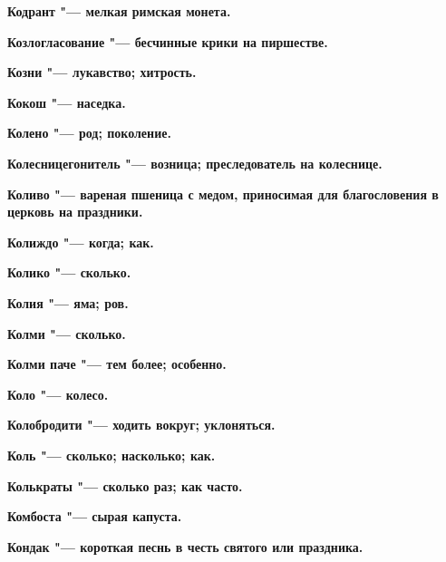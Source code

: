 \bfseries Кодрант \normalfont{} "--- мелкая римская монета. 




\bfseries Козлогласование \normalfont{} "--- бесчинные крики на пиршестве. 




\bfseries Козни \normalfont{} "--- лукавство; хитрость. 




\bfseries Кокош \normalfont{} "--- наседка. 




\bfseries Колено \normalfont{} "--- род; поколение. 




\bfseries Колесницегонитель \normalfont{} "--- возница; преследователь на колеснице. 




\bfseries Коливо \normalfont{} "--- вареная пшеница с медом, приносимая для благословения в церковь на праздники. 




\bfseries Колиждо \normalfont{} "--- когда; как. 




\bfseries Колико \normalfont{} "--- сколько. 




\bfseries Колия \normalfont{} "--- яма; ров. 




\bfseries Колми \normalfont{} "--- сколько. 




\bfseries Колми паче \normalfont{} "--- тем более; особенно. 




\bfseries Коло \normalfont{} "--- колесо. 




\bfseries Колобродити \normalfont{} "--- ходить вокруг; уклоняться. 




\bfseries Коль \normalfont{} "--- сколько; насколько; как. 




\bfseries Колькраты \normalfont{} "--- сколько раз; как часто. 




\bfseries Комбоста \normalfont{} "--- сырая капуста. 




\bfseries Кондак \normalfont{} "--- короткая песнь в честь святого или праздника. 




